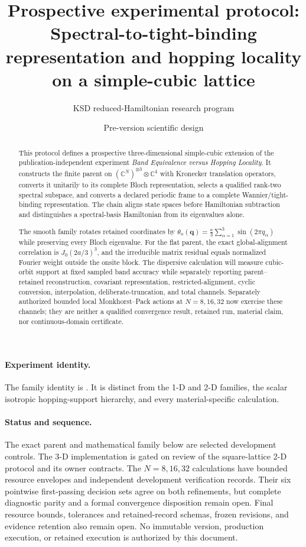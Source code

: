 \documentclass[11pt]{article}
\title{\textbf{Prospective experimental protocol:\\
Spectral-to-tight-binding representation and hopping locality\\
on a simple-cubic lattice}}
\author{KSD reduced-Hamiltonian research program}
\date{Pre-version scientific design}
\begin{document}
\maketitle

\begin{abstract}
This protocol defines a prospective three-dimensional simple-cubic extension of the
publication-independent experiment \emph{Band Equivalence versus Hopping Locality}. It
constructs the finite parent on
$(\mathbb C^N)^{\otimes3}\otimes\mathbb C^4$ with Kronecker translation operators,
converts it unitarily to its complete Bloch representation, selects a qualified rank-two
spectral subspace, and converts a declared periodic frame to a complete
Wannier/tight-binding representation. The chain aligns state spaces before Hamiltonian
subtraction and distinguishes a spectral-basis Hamiltonian from its eigenvalues alone.

The smooth family rotates retained coordinates by
$\theta_a(\mathbf q)=\tfrac a3\sum_{\alpha=1}^3\sin(2\pi q_\alpha)$ while preserving
every Bloch eigenvalue. For the flat parent, the exact global-alignment correlation is
$J_0(2a/3)^3$, and the irreducible matrix residual equals normalized Fourier weight
outside the onsite block. The dispersive calculation will measure cubic-orbit support at
fixed sampled band accuracy while separately reporting parent--retained reconstruction,
covariant representation, restricted-alignment, cyclic conversion, interpolation,
deliberate-truncation, and total channels. Separately authorized bounded local
Monkhorst--Pack actions at $N=8,16,32$ now exercise these channels; they are neither a
qualified convergence result, retained run, material claim, nor continuous-domain
certificate.
\end{abstract}

\paragraph{Experiment identity.}
The family identity is
.
It is distinct from the 1-D and 2-D families, the scalar isotropic hopping-support
hierarchy, and every material-specific calculation.

\paragraph{Status and sequence.}
The exact parent and mathematical family below are selected development controls. The
3-D implementation is gated on review of the square-lattice 2-D protocol and its owner
contracts. The $N=8,16,32$ calculations have bounded resource envelopes and independent
development verification records. Their six pointwise first-passing decision sets agree
on both refinements, but complete diagnostic parity and a formal convergence disposition
remain open. Final resource bounds, tolerances and retained-record schemas, frozen
revisions, and evidence retention also remain open. No immutable version, production
execution, or retained execution is authorized by this document.
\end{document}
